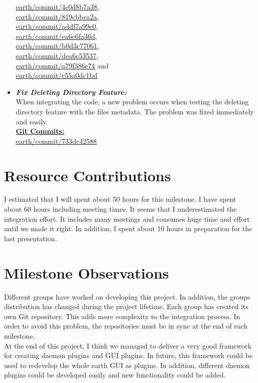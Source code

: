 \documentclass{article}
\begin{document}
\begin{itemize}
\href{http://github.com/Jonv/earth/commit/4e0d8b7a38}{earth/commit/4e0d8b7a38},\\
\href{http://github.com/Jonv/earth/commit/819cbbea2a}{earth/commit/819cbbea2a},\\
\href{http://github.com/Jonv/earth/commit/addf7a99e0}{earth/commit/addf7a99e0},\\
\href{http://github.com/Jonv/earth/commit/ea6e6fa36d}{earth/commit/ea6e6fa36d},\\
\href{http://github.com/Jonv/earth/commit/b0d3c77061}{earth/commit/b0d3c77061},\\
\href{http://github.com/Jonv/earth/commit/dea6c53537}{earth/commit/dea6c53537},\\
\href{http://github.com/Jonv/earth/commit/a79f386e74}{earth/commit/a79f386e74} and \\
\href{http://github.com/Jonv/earth/commit/e55a0dc1bd}{earth/commit/e55a0dc1bd}

\item \textit{\textbf{Fix Deleting Directory Feature:}}\\
When integrating the code, a new problem occurs when testing the deleting directory feature with the files metadata. The problem was fixed immediately and easily.\\
\underline{\textbf{Git Commits: }} \\ 
\href{http://github.com/Jonv/earth/commit/733dc42588}{earth/commit/733dc42588}
\end{itemize}

\newpage

\section*{Resource Contributions}
I estimated that I will spent about 50 hours for this milestone. I have spent about 60 hours including meeting times. It seems that I underestimated the integration effort. It includes many meetings and consumes huge time and effort until we made it right. In addition, I spent about 10 hours in preparation for the last presentation.


\section*{Milestone Observations}
Different groups have worked on developing this project. In addition, the groups distribution has changed during the project lifetime. Each group has created its own Git repository. This adds more complexity to the integration process. In order to avoid this problem, the repositories must be in sync at the end of each milestone. \\
At the end of this project, I think we managed to deliver a very good framework for creating daemon plugins and GUI plugins. In future, this framework could be used to redevelop the whole earth GUI as plugins. In addition, different daemon plugins could be developed easily and new functionality could be added. 
\end{document}
